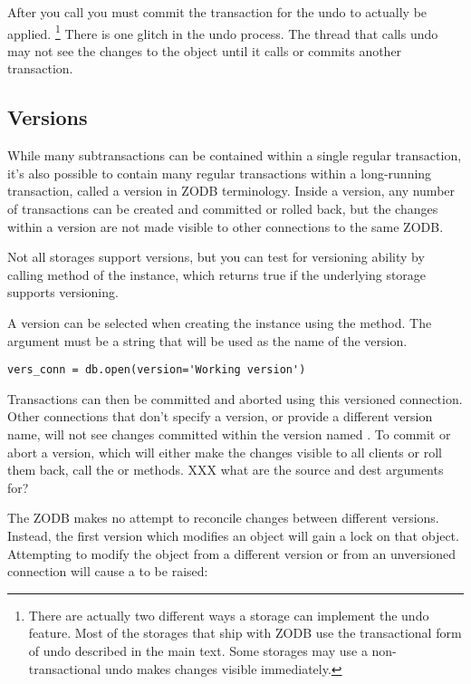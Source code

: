 After you call  you must commit the transaction for the
undo to actually be applied.
\footnote{There are actually two different ways a storage can
implement the undo feature.  Most of the storages that ship with ZODB
use the transactional form of undo described in the main text.  Some
storages may use a non-transactional undo makes changes visible
immediately.}  There is one glitch in the undo process.  The thread
that calls undo may not see the changes to the object until it calls
 or commits another transaction.

\subsection{Versions}

While many subtransactions can be contained within a single regular
transaction, it's also possible to contain many regular transactions
within a long-running transaction, called a version in ZODB
terminology.  Inside a version, any number of transactions can be
created and committed or rolled back, but the changes within a version
are not made visible to other connections to the same ZODB.

Not all storages support versions, but you can test for versioning
ability by calling  method of the
 instance, which returns true if the underlying storage
supports versioning.

A version can be selected when creating the 
instance using the  method.
The  argument must be a string that will be used as the
name of the version.

\begin{verbatim}
vers_conn = db.open(version='Working version')
\end{verbatim}

Transactions can then be committed and aborted using this versioned
connection.  Other connections that don't specify a version, or
provide a different version name, will not see changes committed
within the version named .  To commit or abort a
version, which will either make the changes visible to all clients or
roll them back, call the  or
 methods.
XXX what are the source and dest arguments for?

The ZODB makes no attempt to reconcile changes between different
versions.  Instead, the first version which modifies an object will
gain a lock on that object.  Attempting to modify the object from a
different version or from an unversioned connection will cause a
 to be raised:

